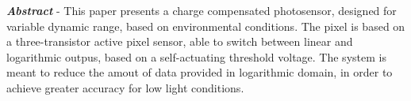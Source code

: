 \textbf{\textit{Abstract}} - This paper presents a charge compensated photosensor, designed for variable dynamic
range, based on environmental conditions. The pixel is based on a three-transistor active pixel sensor, able to
switch between linear and logarithmic outpus, based on a self-actuating threshold voltage. The system is meant to
reduce the amout of data provided in logarithmic domain, in order to achieve greater accuracy for low light conditions.
